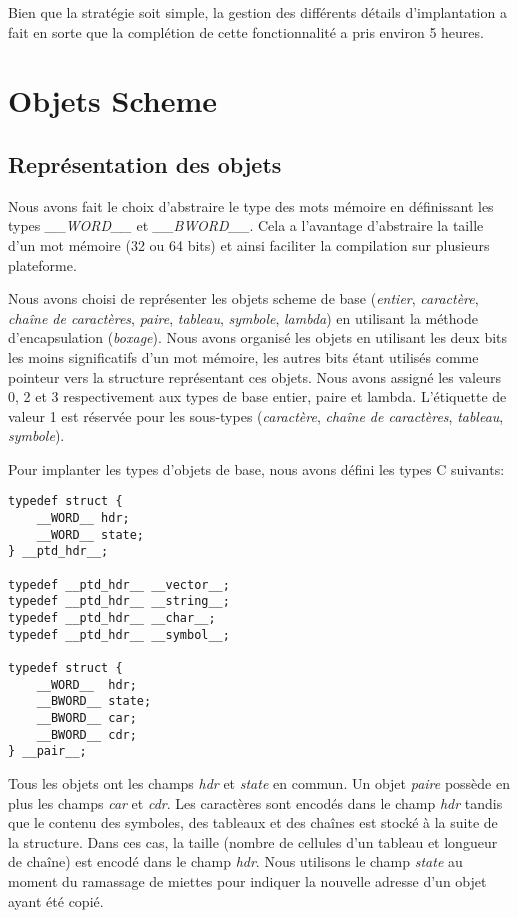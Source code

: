 \documentclass[10pt]{report}
\begin{document}
Bien que la stratégie soit simple, la gestion des différents détails
d'implantation a fait en sorte que la complétion de cette
fonctionnalité a pris environ 5 heures.

\chapter{Objets Scheme}

\section{Représentation des objets}
Nous avons fait le choix d'abstraire le type des mots mémoire en définissant
les types \emph{__WORD__} et \emph{__BWORD__}. Cela a l'avantage d'abstraire
la taille d'un mot mémoire (32 ou 64 bits) et ainsi faciliter la compilation
sur plusieurs plateforme.

Nous avons choisi de représenter les objets scheme de base (\emph{entier},
\emph{caractère}, \emph{chaîne de caractères}, \emph{paire}, \emph{tableau},
\emph{symbole}, \emph{lambda}) en utilisant la méthode d'encapsulation
(\emph{boxage}). Nous avons organisé les objets en utilisant les deux bits les
moins significatifs d'un mot mémoire, les autres bits étant utilisés comme
pointeur vers la structure représentant ces objets. Nous avons assigné les
valeurs 0, 2 et 3 respectivement aux types de base entier, paire et
lambda. L'étiquette de valeur 1 est réservée pour les sous-types
(\emph{caractère}, \emph{chaîne de caractères}, \emph{tableau},
\emph{symbole}). 

Pour implanter les types d'objets de base, nous avons défini les types C suivants:

\begin{verbatim}
typedef struct {
    __WORD__ hdr;
    __WORD__ state;
} __ptd_hdr__;

typedef __ptd_hdr__ __vector__;
typedef __ptd_hdr__ __string__;
typedef __ptd_hdr__ __char__;
typedef __ptd_hdr__ __symbol__;

typedef struct {
    __WORD__  hdr;
    __BWORD__ state;
    __BWORD__ car;
    __BWORD__ cdr;
} __pair__;
\end{verbatim}

Tous les objets ont les champs \emph{hdr} et \emph{state} en commun. Un objet
\emph{paire} possède en plus les champs \emph{car} et \emph{cdr}. Les
caractères sont encodés dans le champ \emph{hdr} tandis que le contenu des
symboles, des tableaux et des chaînes est stocké à la suite de la
structure. Dans ces cas, la taille (nombre de cellules d'un tableau et
longueur de chaîne) est encodé dans le champ \emph{hdr}. Nous utilisons le
champ \emph{state} au moment du ramassage de miettes pour indiquer la nouvelle
adresse d'un objet ayant été copié.
\end{document}
